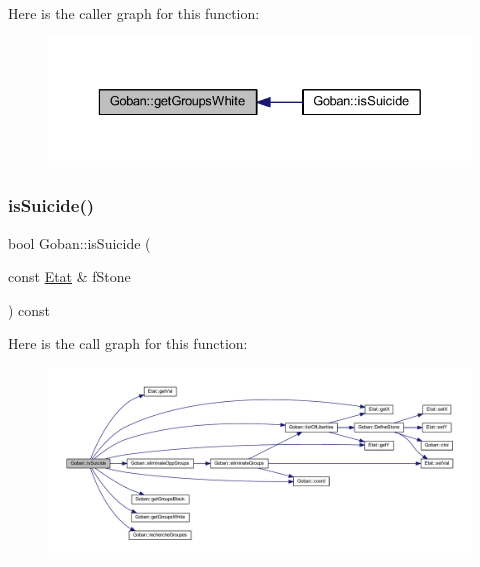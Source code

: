 Here is the caller graph for this function\+:\nopagebreak
\begin{figure}[H]
\begin{center}
\leavevmode
\includegraphics[width=329pt]{class_goban_a0d5ecea357ff85e7d08f2c0855d83e6b_icgraph}
\end{center}
\end{figure}
\mbox{\label{class_goban_a8b95ea2b51c078381562e361ff7febac}} 
\subsubsection{\texorpdfstring{is\+Suicide()}{isSuicide()}}
{\footnotesize\ttfamily bool Goban\+::is\+Suicide (\begin{DoxyParamCaption}\item[{const \hyperlink{class_etat}{Etat} \&}]{f\+Stone }\end{DoxyParamCaption}) const}

Here is the call graph for this function\+:\nopagebreak
\begin{figure}[H]
\begin{center}
\leavevmode
\includegraphics[width=350pt]{class_goban_a8b95ea2b51c078381562e361ff7febac_cgraph}
\end{center}
\end{figure}
\mbox{\label{class_goban_aa2aaa3b4db4549d169bd0ff234d601cb}} 
